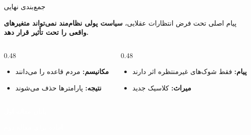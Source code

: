 \documentclass[aspectratio=169,11pt]{beamer}
\newcommand{\important}[1]{\textcolor{AlertRed}{\textbf{#1}}}
\newcommand{\keyword}[1]{\textcolor{MainBlue}{\textbf{#1}}}
\begin{document}
\begin{frame}{جمع‌بندی نهایی}
  \begin{block}{پیام اصلی}
    \centering
    \large
    تحت فرض انتظارات عقلایی، \important{سیاست پولی نظام‌مند نمی‌تواند متغیرهای واقعی را تحت تأثیر قرار دهد.}
  \end{block}
  \vspace{0.5cm}
  \begin{LTR}
  \begin{columns}[T]
    \begin{column}{0.48\textwidth}
      \begin{RTL}
      \begin{itemize}
        \item \keyword{مکانیسم:} مردم قاعده را می‌دانند
        \item \keyword{نتیجه:} پارامترها حذف می‌شوند
      \end{itemize}
      \end{RTL}
    \end{column}
    \hfill
    \begin{column}{0.48\textwidth}
      \begin{RTL}
      \begin{itemize}
        \item \keyword{پیام:} فقط شوک‌های غیرمنتظره اثر دارند
        \item \keyword{میراث:} کلاسیک جدید
      \end{itemize}
      \end{RTL}
    \end{column}
  \end{columns}
  \end{LTR}
\end{frame}

\begin{frame}[standout]
  \centering
  \Huge
  \textcolor{white}{پایان مقاله اول}
  \vspace{0.5cm}

  \large
  \textcolor{white}{آماده برای مقاله دوم:}\\
  \textcolor{AccentOrange}{}
\end{frame}
\end{document}
